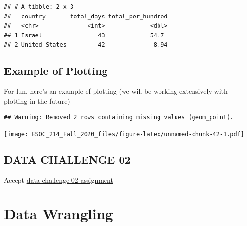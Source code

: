 \documentclass[
]{book}
\newenvironment{Shaded}{\begin{snugshade}}{\end{snugshade}}
\newcommand{\DataTypeTok}[1]{\textcolor[rgb]{0.13,0.29,0.53}{#1}}
\newcommand{\KeywordTok}[1]{\textcolor[rgb]{0.13,0.29,0.53}{\textbf{#1}}}
\newcommand{\NormalTok}[1]{#1}
\newcommand{\OperatorTok}[1]{\textcolor[rgb]{0.81,0.36,0.00}{\textbf{#1}}}
\newcommand{\StringTok}[1]{\textcolor[rgb]{0.31,0.60,0.02}{#1}}
\begin{document}
\begin{verbatim}
## # A tibble: 2 x 3
##   country       total_days total_per_hundred
##   <chr>              <int>             <dbl>
## 1 Israel                43             54.7 
## 2 United States         42              8.94
\end{verbatim}

\hypertarget{example-of-plotting}{%
\section{Example of Plotting}\label{example-of-plotting}}

For fun, here's an example of plotting (we will be working extensively with plotting in the future).

\begin{Shaded}
\end{Shaded}

\begin{verbatim}
## Warning: Removed 2 rows containing missing values (geom_point).
\end{verbatim}

\texttt{[image: ESOC\_214\_Fall\_2020\_files/figure-latex/unnamed-chunk-42-1.pdf]}

\hypertarget{data-challenge-02}{%
\section{DATA CHALLENGE 02}\label{data-challenge-02}}

Accept \href{}{data challenge 02 assignment}

\hypertarget{data-wrangling}{%
\chapter{Data Wrangling}\label{data-wrangling}}
\end{document}
